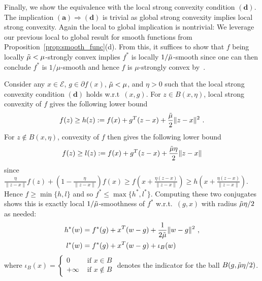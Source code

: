 \documentclass[sn-mathphys,Numbered]{sn-jnl}%
\begin{document}
\begin{appendices}
{Finally, we show the equivalence with the local strong convexity condition $\mathbf{(d)}$. The implication $\mathbf{(a)\Rightarrow(d)}$ is trivial as global strong convexity implies local strong convexity. Again the local to global implication is nontrivial: We leverage our previous local to global result for smooth functions from Proposition~\ref{prop:smooth_func}(d). From this, it suffices to show that $f$ being locally $\Tilde{\mu} <\mu$-strongly convex implies $f^*$ is locally $1/\Tilde{\mu}$-smooth since one can then conclude $f^*$ is $1/\mu$-smooth and hence $f$  is $\mu$-strongly convex by~\cite[Theorem 12.60 $\mathbf{(a)\Leftrightarrow(b)}$]{rockafellar2009variational}. 

Consider any $x\in\mathcal{E}$, $g\in \partial f(x)$, $\Tilde{\mu} < \mu$, and $\eta>0$ such that the local strong convexity condition $\mathbf{(d)}$ holds w.r.t~$(x,g)$. For $z\in B(x,\eta)$, local strong convexity of $f$ gives the following lower bound
$$ f(z) \geq h(z) := f(x)+g^T(z-x)+\frac{\Tilde{\mu}}{2}\|z-x\|^2 \ . $$
For $z\not\in B(x,\eta)$, convexity of $f$ then gives the following lower bound 
$$ f(z) \geq l(z) := f(x)+g^T(z-x)+\frac{\Tilde{\mu} \eta}{2}\|z-x\| $$
since $\frac{\eta}{\|z-x\|} f(z) + (1-\frac{\eta}{\|z-x\|})f(x) \geq f(x + \frac{\eta(z-x)}{\|z-x\|}) \geq h(x + \frac{\eta(z-x)}{\|z-x\|})$. Hence $f \geq \min\{h,l\}$ and so $f^* \leq \max\{h^*,l^*\}$. Computing these two conjugates shows this is exactly local $1/\Tilde{\mu}$-smoothness of $f^*$ w.r.t.~$(g,x)$ with radius $\Tilde{\mu}\eta/2$ as needed:
\begin{align*}
    h^*(w) &= f^*(g)+x^T(w-g)+\frac{1}{2\Tilde{\mu}}\|w-g\|^2 \ , \\
    l^*(w) &= f^*(g)+x^T(w-g)+\iota_{B}(w)
\end{align*}
where $\iota_B(x)=\begin{cases}0 & \text{ if } x\in B\\ +\infty & \text{ if } x \notin B \end{cases}$ denotes the indicator for the ball $B(g,\Tilde{\mu}\eta/2)$.



}
\end{appendices}
\end{document}
